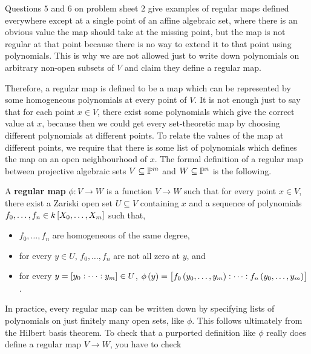 \begin{note*}
Questions $ 5 $ and $ 6 $ on problem sheet $ 2 $ give examples of regular maps defined everywhere except at a single point of an affine algebraic set, where there is an obvious value the map should take at the missing point, but the map is not regular at that point because there is no way to extend it to that point using polynomials. This is why we are not allowed just to write down polynomials on arbitrary non-open subsets of $ V $ and claim they define a regular map.
\end{note*}

Therefore, a regular map is defined to be a map which can be represented by some homogeneous polynomials at every point of $ V $. It is not enough just to say that for each point $ x \in V $, there exist some polynomials which give the correct value at $ x $, because then we could get every set-theoretic map by choosing different polynomials at different points. To relate the values of the map at different points, we require that there is some list of polynomials which defines the map on an open neighbourhood of $ x $. The formal definition of a regular map between projective algebraic sets $ V \subseteq \mathbb{P}^m $ and $ W \subseteq \mathbb{P}^n $ is the following.

\begin{definition*}
A \textbf{regular map} $ \phi : V \to W $ is a function $ V \to W $ such that for every point $ x \in V $, there exist a Zariski open set $ U \subseteq V $ containing $ x $ and a sequence of polynomials $ f_0, \dots, f_n \in k\sbr{X_0, \dots, X_m} $ such that,
\begin{itemize}
\item $ f_0, \dots, f_n $ are homogeneous of the same degree,
\item for every $ y \in U $, $ f_0, \dots, f_n $ are not all zero at $ y $, and
\item for every $ y = \sbr{y_0 : \dots : y_m} \in U $, $ \phi\br{y} = \sbr{f_0\br{y_0, \dots, y_m} : \dots : f_n\br{y_0, \dots, y_m}} $.
\end{itemize}
\end{definition*}

In practice, every regular map can be written down by specifying lists of polynomials on just finitely many open sets, like $ \phi $. This follows ultimately from the Hilbert basis theorem. To check that a purported definition like $ \phi $ really does define a regular map $ V \to W $, you have to check

